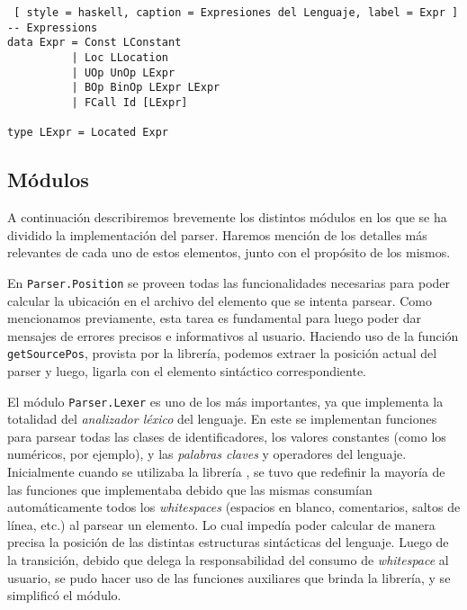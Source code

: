 \begin{lstlisting} [ style = haskell, caption = Expresiones del Lenguaje, label = Expr ]
-- Expressions
data Expr = Const LConstant
          | Loc LLocation
          | UOp UnOp LExpr
          | BOp BinOp LExpr LExpr
          | FCall Id [LExpr]

type LExpr = Located Expr
\end{lstlisting}

\subsection{Módulos}

A continuación describiremos brevemente los distintos módulos en los que se ha dividido la implementación del parser.
Haremos mención de los detalles más relevantes de cada uno de estos elementos, junto con el propósito de los mismos.

En \lstinline[style = module]{Parser.Position} se proveen todas las funcionalidades necesarias para poder calcular la ubicación en el archivo del elemento que se intenta parsear.
Como mencionamos previamente, esta tarea es fundamental para luego poder dar mensajes de errores precisos e informativos al usuario.
Haciendo uso de la función \lstinline[style = haskell]{getSourcePos}, provista por la librería, podemos extraer la posición actual del parser y luego, ligarla con el elemento sintáctico correspondiente.

El módulo \lstinline[style = module]{Parser.Lexer} es uno de los más importantes, ya que implementa la totalidad del \textit{analizador léxico} del lenguaje.
En este se implementan funciones para parsear todas las clases de identificadores, los valores constantes (como los numéricos, por ejemplo), y las \textit{palabras claves} y operadores del lenguaje.
Inicialmente cuando se utilizaba la librería \Parsec{}, se tuvo que redefinir la mayoría de las funciones que implementaba debido que las mismas consumían automáticamente todos los \textit{whitespaces} (espacios en blanco, comentarios, saltos de línea, etc.) al parsear un elemento.
Lo cual impedía poder calcular de manera precisa la posición de las distintas estructuras sintácticas del lenguaje.
Luego de la transición, debido que \Megaparsec{} delega la responsabilidad del consumo de \textit{whitespace} al usuario, se pudo hacer uso de las funciones auxiliares que brinda la librería, y se simplificó el módulo.

